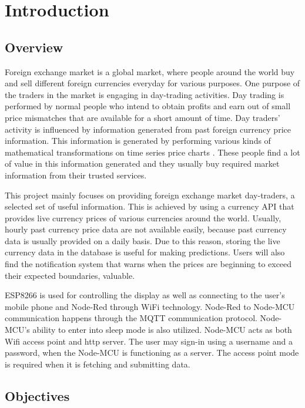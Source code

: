 \newpage
\section{Introduction}

\subsection{Overview}

Foreign exchange market is a global market, where people around the world buy and sell different foreign currencies everyday for various purposes. One purpose of the traders in the market is engaging in day-trading activities. Day trading is performed by normal people who intend to obtain profits and earn out of small price mismatches that are available for a short amount of time. Day traders’ activity is influenced by information generated from past foreign currency price information. This information is generated by performing various kinds of mathematical transformations on time series price charts . These people find a lot of value in this information generated and they usually buy required market information from their trusted services.

This project mainly focuses on providing foreign exchange market day-traders, a selected set of useful information. This is achieved by using a currency API that provides live currency prices of various currencies around the world. Usually, hourly past currency price data are not available easily, because past currency data is usually provided on a daily basis. Due to this reason, storing the live currency data in the database is useful for making predictions. Users will also find the notification system that warns when the prices are beginning to exceed their expected boundaries, valuable.

ESP8266 is used for controlling the display as well as connecting to the user’s mobile phone and Node-Red through WiFi technology. Node-Red to Node-MCU communication happens through the MQTT communication protocol. Node-MCU’s ability to enter into sleep mode is also utilized. Node-MCU acts as both Wifi access point and http server. The user may sign-in using a username and a password, when the Node-MCU is functioning as a server. The access point mode is required when it is fetching and submitting data.


\subsection{Objectives}

